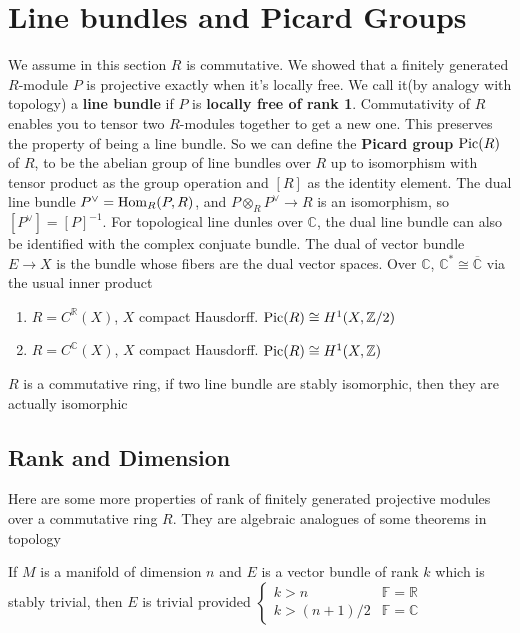 \documentclass[main]{subfiles}
\begin{document}
\section{Line bundles and Picard Groups}

We assume in this section $R$ is commutative. We showed that a finitely generated $R$-module $P$ is projective exactly when it's locally free. We call it(by analogy with topology) a \textbf{line bundle} if $P$ is \textbf{locally free of rank 1}. Commutativity of $R$ enables you to tensor two $R$-modules together to get a new one. This preserves the property of being a line bundle. So we can define the \textbf{Picard group} $\operatorname{Pic}(R)$ of $R$, to be the abelian group of line bundles over $R$ up to isomorphism with tensor product as the group operation and $[R]$ as the identity element. The dual line bundle $P^\vee=\operatorname{Hom}_R(P,R)$, and $P\otimes_RP^\vee\to R$ is an isomorphism, so $[P^\vee]=[P]^{-1}$. For topological line dunles over $\mathbb C$, the dual line bundle can also be identified with the complex conjuate bundle. The dual of vector bundle $E\to X$ is the bundle whose fibers are the dual vector spaces. Over $\mathbb C$, $\mathbb C^*\cong \overline{\mathbb C}$ via the usual inner product

\begin{example}\hfill
\begin{enumerate}
\item $R=C^{\mathbb R}(X)$, $X$ compact Hausdorff. $\operatorname{Pic}(R)\cong H^1(X,\mathbb Z/2)$
\item $R=C^{\mathbb C}(X)$, $X$ compact Hausdorff. $\operatorname{Pic}(R)\cong H^1(X,\mathbb Z)$
\end{enumerate}
\end{example}

\begin{theorem}
$R$ is a commutative ring, if two line bundle are stably isomorphic, then they are actually isomorphic
\end{theorem}

\subsection{Rank and Dimension}

Here are some more properties of rank of finitely generated projective modules over a commutative ring $R$. They are algebraic analogues of some theorems in topology

\begin{theorem}
If $M$ is a manifold of dimension $n$ and $E$ is a vector bundle of rank $k$ which is stably trivial, then $E$ is trivial provided
$\begin{cases}
k>n &\mathbb F=\mathbb R\\
k>(n+1)/2 &\mathbb F=\mathbb C
\end{cases}$
\end{theorem}
\end{document}
